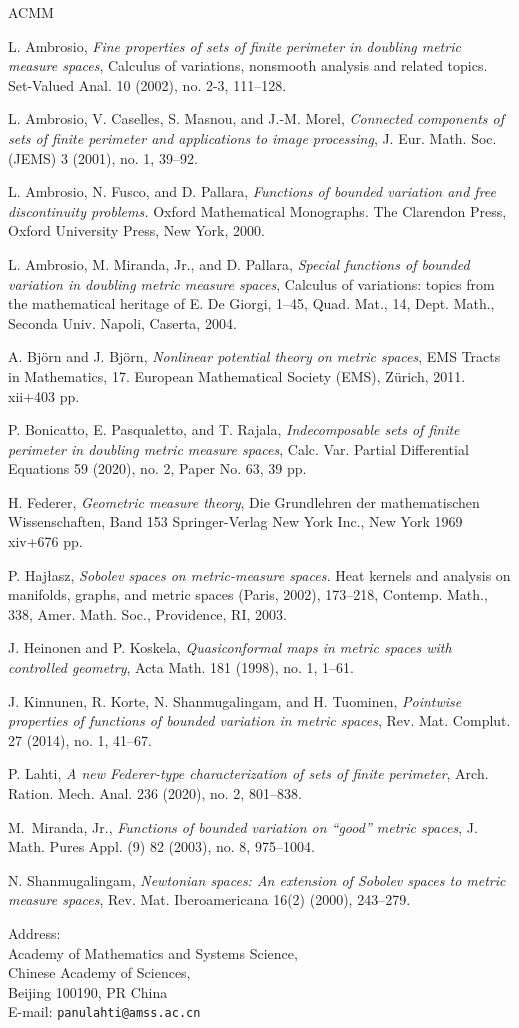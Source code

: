 \documentclass[11pt]{article}
\numberwithin{equation}{section}
\theoremstyle{plain}
\theoremstyle{definition}
\numberwithin{equation}{section}
\begin{document}
\begin{thebibliography}{ACMM}

L. Ambrosio,
\textit{Fine properties of sets of finite perimeter in doubling metric measure spaces},
Calculus of variations, nonsmooth analysis and related topics.
Set-Valued Anal. 10 (2002), no. 2-3, 111--128.

L. Ambrosio, V. Caselles, S. Masnou, and J.-M. Morel,
\textit{Connected components of sets of finite perimeter and applications to image processing},
J. Eur. Math. Soc. (JEMS) 3 (2001), no. 1, 39--92.

L. Ambrosio, N. Fusco, and D. Pallara,
\textit{Functions of bounded variation and free discontinuity problems.}
Oxford Mathematical Monographs. The Clarendon Press, Oxford University Press, New York, 2000.

L. Ambrosio, M. Miranda, Jr., and D. Pallara,
\textit{Special functions of bounded variation in doubling metric measure spaces},
Calculus of variations: topics from the mathematical heritage of E. De Giorgi, 1--45,
Quad. Mat., 14, Dept. Math., Seconda Univ. Napoli, Caserta, 2004.

A. Bj\"orn and J. Bj\"orn,
\textit{Nonlinear potential theory on metric spaces},
EMS Tracts in Mathematics, 17. European Mathematical Society (EMS), Z\"urich, 2011. xii+403 pp.

P. Bonicatto, E. Pasqualetto, and T. Rajala,
\textit{Indecomposable sets of finite perimeter in doubling metric measure spaces},
Calc. Var. Partial Differential Equations 59 (2020), no. 2, Paper No. 63, 39 pp.

H. Federer,
\textit{Geometric measure theory},
Die Grundlehren der mathematischen Wissenschaften, Band 153 Springer-Verlag New York Inc., New York 1969 xiv+676 pp.

P. Haj\l{}asz,
\textit{Sobolev spaces on metric-measure spaces.}
Heat kernels and analysis on manifolds, graphs, and metric spaces (Paris, 2002), 173--218,
Contemp. Math., 338, Amer. Math. Soc., Providence, RI, 2003.

J. Heinonen and P. Koskela,
\textit{Quasiconformal maps in metric spaces with controlled geometry},
Acta Math. 181 (1998), no. 1, 1--61.

J. Kinnunen, R. Korte, N. Shanmugalingam, and H. Tuominen,
\textit{Pointwise properties of functions of bounded variation in metric spaces},
Rev. Mat. Complut. 27 (2014), no. 1, 41--67.

P. Lahti,
\textit{A new Federer-type characterization of sets of finite perimeter},
Arch. Ration. Mech. Anal. 236 (2020), no. 2, 801--838.

M.~Miranda, Jr.,
\textit{Functions of bounded variation on ``good'' metric spaces},
J. Math. Pures Appl. (9) 82  (2003),  no. 8, 975--1004.

N. Shanmugalingam,
\textit{Newtonian spaces: An extension of Sobolev spaces to metric measure spaces},
Rev. Mat. Iberoamericana 16(2) (2000), 243--279.

\end{thebibliography}

\noindent Address:\\

\noindent Academy of Mathematics and Systems Science,\\
Chinese Academy of Sciences,\\
Beijing 100190, PR China\\
E-mail: {\tt panulahti@amss.ac.cn}
\end{document}
